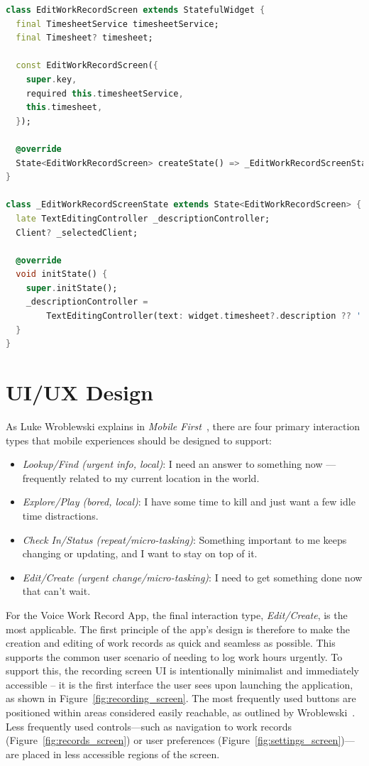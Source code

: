 \documentclass[
  digital,     %
  oneside,     %
  nosansbold,  %
  nocolorbold, %
  lof,         %
  lot,         %
]{fithesis4}
\begin{document}
\newpage
\begin{lstlisting}[language=Dart, caption={Stateful example on EditWorkRecordScreen Widget class}, label={lst:edit_work_record_screen}, floatplacement=H, showstringspaces=false]
class EditWorkRecordScreen extends StatefulWidget {
  final TimesheetService timesheetService;
  final Timesheet? timesheet;

  const EditWorkRecordScreen({
    super.key,
    required this.timesheetService,
    this.timesheet,
  });

  @override
  State<EditWorkRecordScreen> createState() => _EditWorkRecordScreenState();
}

class _EditWorkRecordScreenState extends State<EditWorkRecordScreen> {
  late TextEditingController _descriptionController;
  Client? _selectedClient;

  @override
  void initState() {
    super.initState();
    _descriptionController =
        TextEditingController(text: widget.timesheet?.description ?? '');
  }
}
\end{lstlisting}

\newpage
\section{UI/UX Design}

As Luke Wroblewski explains in \textit{Mobile First}~\cite[p.~50]{wroblewski2011mobile}, there are four primary interaction types that mobile experiences should be designed to support:

\begin{itemize}
  \item \textit{Lookup/Find (urgent info, local)}: I need an answer to something now — frequently related to my current location in the world.
  \item \textit{Explore/Play (bored, local)}: I have some time to kill and just want a few idle time distractions.
  \item \textit{Check In/Status (repeat/micro-tasking)}: Something important to me keeps changing or updating, and I want to stay on top of it.
  \item \textit{Edit/Create (urgent change/micro-tasking)}: I need to get something done now that can’t wait.
\end{itemize}

For the Voice Work Record App, the final interaction type, \textit{Edit/Create}, is the most applicable. The first principle of the app’s design is therefore to make the creation and editing of work records as quick and seamless as possible. This supports the common user scenario of needing to log work hours urgently. To support this, the recording screen \gls{UI} is intentionally minimalist and immediately accessible -- it is the first interface the user sees upon launching the application, as shown in Figure~\ref{fig:recording_screen}. The most frequently used buttons are positioned within areas considered easily reachable, as outlined by Wroblewski~\cite[p.~73]{wroblewski2011mobile}. Less frequently used controls—such as navigation to work records (Figure~\ref{fig:records_screen}) or user preferences (Figure~\ref{fig:settings_screen})—are placed in less accessible regions of the screen.
\end{document}
